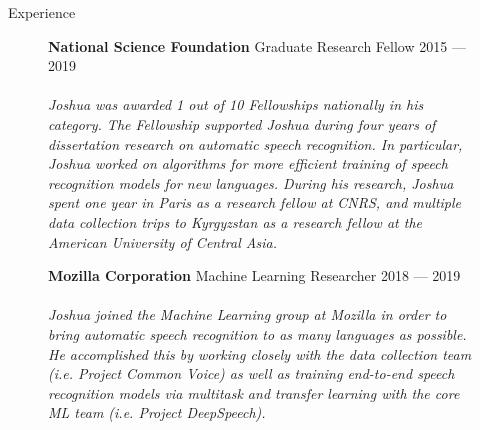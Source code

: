 \documentclass{cv} %
\begin{document}
\begin{rSection}{Experience}
  \begin{figure}[H]
    \begin{minipage}{0.2\textwidth}
      \centering
      
    \end{minipage}
    \begin{minipage}{0.8\textwidth}
      {\bf National Science Foundation} \hfill Graduate Research Fellow \hspace{0.5cm} {2015 --- 2019} \\ \\
      \textit{Joshua was awarded 1 out of 10 Fellowships nationally in his category. The Fellowship supported Joshua during four years of dissertation research on automatic speech recognition. In particular, Joshua worked on algorithms for more efficient training of speech recognition models for new languages. During his research, Joshua spent one year in Paris as a research fellow at CNRS, and multiple data collection trips to Kyrgyzstan as a research fellow at the American University of Central Asia.} \\
    \end{minipage}
  \end{figure}

  \begin{figure}[H]
    \begin{minipage}{0.2\textwidth}
      \centering
      
    \end{minipage}
    \begin{minipage}{0.8\textwidth}
      {\bf Mozilla Corporation} \hfill Machine Learning Researcher \hspace{0.5cm} {2018 --- 2019} \\ \\
      \textit{Joshua joined the Machine Learning group at Mozilla in order to bring automatic speech recognition to as many languages as possible. He accomplished this by working closely with the data collection team (i.e. Project Common Voice) as well as training end-to-end speech recognition models via multitask and transfer learning with the core ML team (i.e. Project DeepSpeech).} \\
    \end{minipage}
  \end{figure}


\end{rSection}
\end{document}
